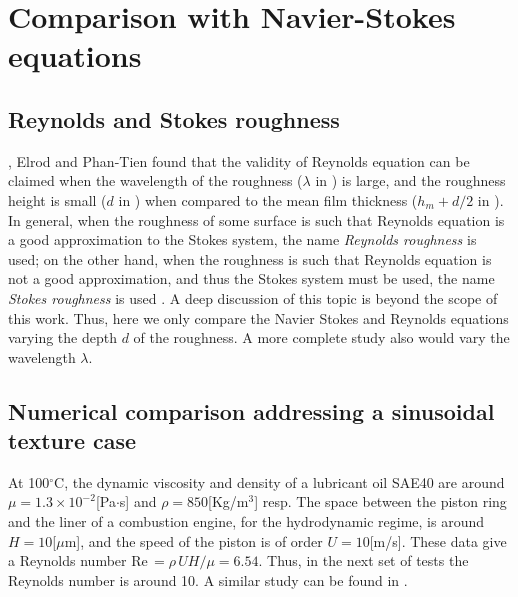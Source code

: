 \section{Comparison with Navier-Stokes equations}\label{sec:comparison_nvs_reynolds}
\subsection{Reynolds and Stokes roughness}
\citeauthor{chambat1986} \cite{bayada1988}, Elrod \cite{elrod1979} and Phan-Tien \cite{phan1981} found that the validity of Reynolds equation can be claimed when the wavelength of the roughness ($\lambda$ in ) is large, and the roughness height is small ($d$ in ) when compared to the  mean film thickness ($h_m+d/2$ in ). In general, when the roughness of some surface is such that Reynolds equation is a good approximation to the Stokes system, the name \emph{Reynolds roughness} is used; on the other hand, when the roughness is such that Reynolds equation is not a good approximation, and thus the Stokes system must be used, the name \emph{Stokes roughness} is used \cite{bayada1988}. A deep discussion of this topic is beyond the scope of this work. Thus, here we only compare the Navier Stokes and Reynolds equations varying the depth $d$ of the roughness. A more complete study also would vary the wavelength $\lambda$.
\subsection{Numerical comparison addressing a sinusoidal texture case}
At 100$^\circ$C, the dynamic viscosity and density of a lubricant oil SAE40 are around\\ $\mu=1.3\times 10^{-2}$[Pa$\cdot$s] and $\rho=850$[Kg/m$^3$] resp. The space between the piston ring and the liner of a combustion engine, for the hydrodynamic regime, is around $H=10$[$\mu$m], and the speed of the piston is of order $U=10$[m/s]. These data give a Reynolds number Re$\,=\rho\, U H/\mu=6.54$. Thus, in the next set of tests the Reynolds number is around 10. A similar study can be found in \cite{song2003}.

